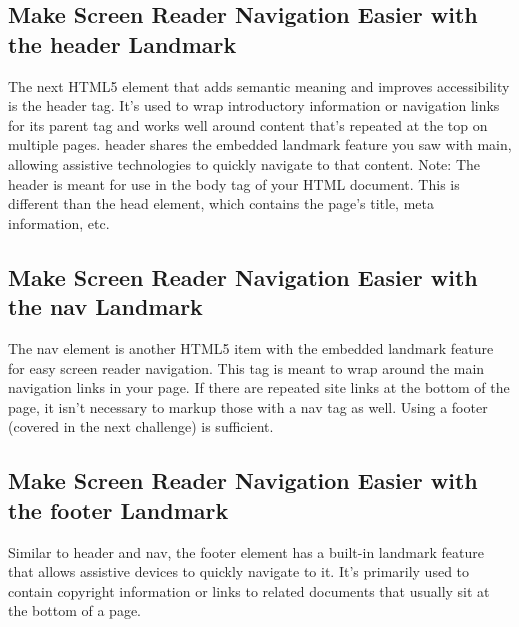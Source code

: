 \documentclass{article}%
\begin{document}
%
\subsection{Make Screen Reader Navigation Easier with the header Landmark}%
\label{subsec:MakeScreenReaderNavigationEasierwiththeheaderLandmark}%
The next HTML5 element that adds semantic meaning and improves accessibility is the header tag. It's used to wrap introductory information or navigation links for its parent tag and works well around content that's repeated at the top on multiple pages.\newline%
header shares the embedded landmark feature you saw with main, allowing assistive technologies to quickly navigate to that content.\newline%
Note: The header is meant for use in the body tag of your HTML document. This is different than the head element, which contains the page's title, meta information, etc.\newline%

%
\subsection{Make Screen Reader Navigation Easier with the nav Landmark}%
\label{subsec:MakeScreenReaderNavigationEasierwiththenavLandmark}%
The nav element is another HTML5 item with the embedded landmark feature for easy screen reader navigation. This tag is meant to wrap around the main navigation links in your page.\newline%
If there are repeated site links at the bottom of the page, it isn't necessary to markup those with a nav tag as well. Using a footer (covered in the next challenge) is sufficient.\newline%

%
\subsection{Make Screen Reader Navigation Easier with the footer Landmark}%
\label{subsec:MakeScreenReaderNavigationEasierwiththefooterLandmark}%
Similar to header and nav, the footer element has a built{-}in landmark feature that allows assistive devices to quickly navigate to it. It's primarily used to contain copyright information or links to related documents that usually sit at the bottom of a page.\newline%

%
\end{document}
